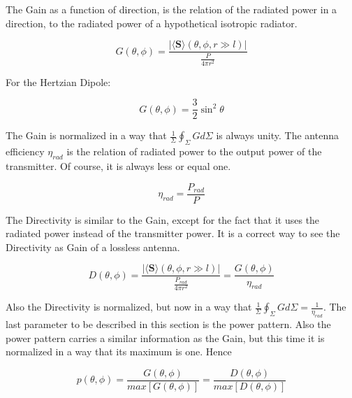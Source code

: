 \documentclass[a4paper,14pt]{extbook}
\begin{document}
The Gain as a function of direction, is the relation of the radiated power in a direction, to the radiated power of a hypothetical isotropic radiator.

\begin{equation}\label{gain}
G( \theta , \phi )= \frac{| \langle \mathbf{S} \rangle ( \theta , \phi , r\gg l) | }{\frac{P}{4\pi r^2}}
\end{equation}

For the Hertzian Dipole:

\begin{equation}\label{gain_hd}
G( \theta , \phi )= \frac{3}{2} \sin^2 \theta
\end{equation}

The Gain is normalized in a way that $\frac{1}{\Sigma}\oint_\Sigma G d\Sigma$ is always unity. The antenna efficiency $\eta_{rad}$ is the relation of radiated power to the output power of the transmitter. Of course, it is always less or equal one.

\begin{equation}\label{antenna_efficiency}
\eta_{rad} = \frac{P_{rad}}{P}
\end{equation}

The Directivity is similar to the Gain, except for the fact that it uses the radiated power instead of the transmitter power. It is a correct way to see the Directivity as Gain of a lossless antenna.

\begin{equation}\label{directivity}
D( \theta , \phi )= \frac{| \langle \mathbf{S} \rangle ( \theta , \phi , r\gg l) | } {\frac{P_{rad}}{4\pi r^2}} = \frac{G( \theta , \phi )}{\eta_{rad}}
\end{equation}

Also the Directivity is normalized, but now in a way that  $\frac{1}{\Sigma}\oint_\Sigma G d\Sigma = \frac{1}{\eta_{rad}}$. The last parameter to be described in this section is the power pattern. Also the power pattern carries a similar information as the Gain, but this time it is normalized in a way that its maximum is one. Hence

\begin{equation}\label{power_pattern}
p ( \theta , \phi ) = \frac{G( \theta , \phi )}{max[G( \theta , \phi )]} = \frac{D( \theta , \phi )}{max[D( \theta , \phi )]}
\end{equation}
\end{document}
